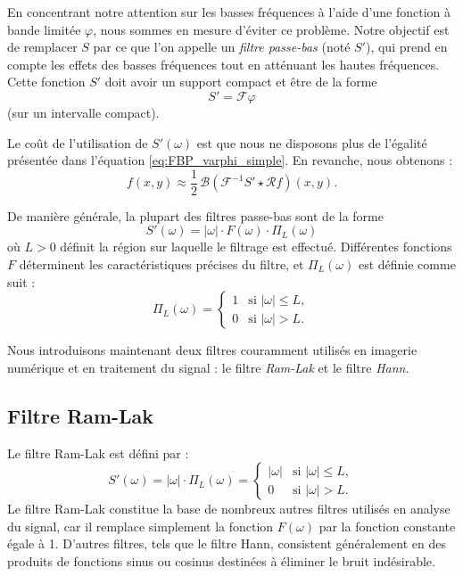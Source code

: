 En concentrant notre attention sur les basses fréquences à l'aide d'une fonction à bande limitée $\varphi$, nous sommes en mesure d'éviter ce problème. Notre objectif est de remplacer $S$ par ce que l'on appelle un \emph{filtre passe-bas} (noté $S'$), qui prend en compte les effets des basses fréquences tout en atténuant les hautes fréquences. Cette fonction $S'$ doit avoir un support compact et être de la forme
\begin{equation}
S' = \mathcal{F}\varphi
\end{equation}
(sur un intervalle compact).

Le coût de l'utilisation de $S'(\omega)$ est que nous ne disposons plus de l'égalité présentée dans l'équation \eqref{eq:FBP_varphi_simple}. En revanche, nous obtenons :
\begin{equation}
    f(x,y) \approx \frac{1}{2}\,\mathcal{B}\!\left(\mathcal{F}^{-1} S' \star \mathcal{R}f \right)(x,y).
    \label{eq:FBP_varphi_approx}
\end{equation}

De manière générale, la plupart des filtres passe-bas sont de la forme
\begin{equation}
S'(\omega) = |\omega| \cdot F(\omega) \cdot \Pi_L(\omega)
\end{equation}
où $L > 0$ définit la région sur laquelle le filtrage est effectué. Différentes fonctions $F$ déterminent les caractéristiques précises du filtre, et $\Pi_L(\omega)$ est définie comme suit :
\begin{equation}
    \Pi_L(\omega) =
    \begin{cases}
        1 & \text{si } |\omega| \leq L, \\
        0 & \text{si } |\omega| > L.
    \end{cases}
\end{equation}

Nous introduisons maintenant deux filtres couramment utilisés en imagerie numérique et en traitement du signal : le filtre \emph{Ram-Lak} et le filtre \emph{Hann}.

\subsection*{Filtre Ram-Lak}

Le filtre Ram-Lak est défini par :
\begin{equation}
S'(\omega) = |\omega| \cdot \Pi_L(\omega) =
\begin{cases}
|\omega| & \text{si } |\omega| \leq L, \\
0 & \text{si } |\omega| > L.
\end{cases}
\end{equation}
Le filtre Ram-Lak constitue la base de nombreux autres filtres utilisés en analyse du signal, car il remplace simplement la fonction $F(\omega)$ par la fonction constante égale à 1. D'autres filtres, tels que le filtre Hann, consistent généralement en des produits de fonctions sinus ou cosinus destinées à éliminer le bruit indésirable.

